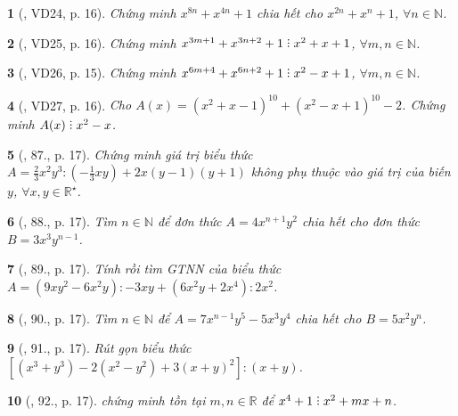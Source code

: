\documentclass{article}
\newtheorem{baitoan}{}
\DeclareRobustCommand{\divby}{%
	\mathrel{\vbox{\baselineskip.65ex\lineskiplimit0pt\hbox{.}\hbox{.}\hbox{.}}}%
}
\begin{document}
\begin{baitoan}[\cite{Binh_Toan_8_tap_1}, VD24, p. 16]
	Chứng minh $x^{8n} + x^{4n} + 1$ chia hết cho $x^{2n} + x^n + 1$, $\forall n\in\mathbb{N}$.
\end{baitoan}

\begin{baitoan}[\cite{Binh_Toan_8_tap_1}, VD25, p. 16]
	Chứng minh $x^{3m+1} + x^{3n+2} + 1\divby x^2 + x + 1$, $\forall m,n\in\mathbb{N}$.
\end{baitoan}

\begin{baitoan}[\cite{Binh_Toan_8_tap_1}, VD26, p. 15]
	Chứng minh $x^{6m+4} + x^{6n+2} + 1\divby x^2 - x + 1$, $\forall m,n\in\mathbb{N}$.
\end{baitoan}

\begin{baitoan}[\cite{Binh_Toan_8_tap_1}, VD27, p. 16]
	Cho $A(x) = (x^2 + x - 1)^{10} + (x^2 - x + 1)^{10} - 2$. Chứng minh $A(x)\divby x^2 - x$.
\end{baitoan}

\begin{baitoan}[\cite{Binh_Toan_8_tap_1}, 87., p. 17]
	Chứng minh giá trị biểu thức $A = \frac{2}{3}x^2y^3:\left(-\frac{1}{3}xy\right) + 2x(y - 1)(y + 1)$ không phụ thuộc vào giá trị của biến $y$, $\forall x,y\in\mathbb{R}^\star$.
\end{baitoan}

\begin{baitoan}[\cite{Binh_Toan_8_tap_1}, 88., p. 17]
	Tìm $n\in\mathbb{N}$ để đơn thức $A = 4x^{n+1}y^2$ chia hết cho đơn thức $B = 3x^3y^{n-1}$.
\end{baitoan}

\begin{baitoan}[\cite{Binh_Toan_8_tap_1}, 89., p. 17]
	Tính rồi tìm {\rm GTNN} của biểu thức $A = (9xy^2 - 6x^2y):-3xy + (6x^2y + 2x^4):2x^2$.
\end{baitoan}

\begin{baitoan}[\cite{Binh_Toan_8_tap_1}, 90., p. 17]
	Tìm $n\in\mathbb{N}$ để $A = 7x^{n-1}y^5 - 5x^3y^4$ chia hết cho $B = 5x^2y^n$.
\end{baitoan}

\begin{baitoan}[\cite{Binh_Toan_8_tap_1}, 91., p. 17]
	Rút gọn biểu thức $\left[(x^3 + y^3) - 2(x^2 - y^2) + 3(x + y)^2\right]:(x + y)$.
\end{baitoan}

\begin{baitoan}[\cite{Binh_Toan_8_tap_1}, 92., p. 17]
	chứng minh tồn tại $m,n\in\mathbb{R}$ để $x^4 + 1\divby x^2 + mx + n$.
\end{baitoan}
\end{document}
